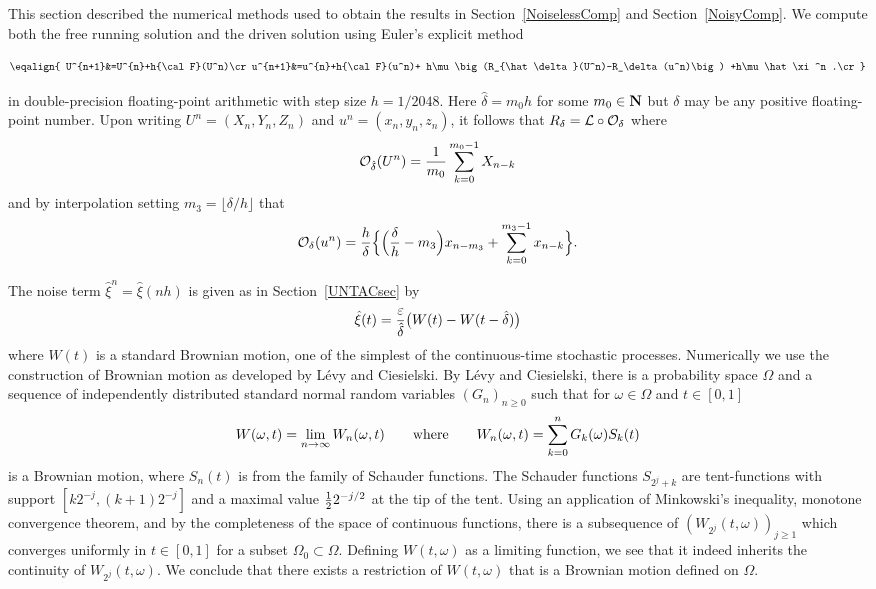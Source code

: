 \documentclass[master,tocprelim,12pt]{unrthesis}
\theoremstyle{definition}
\def\wwords#1{\qquad\hbox{#1}\qquad}
\numberwithin{equation}{chapter}
\begin{document}
\begin{manuscript}
This section described the numerical methods used to obtain the 
results in Section~\ref{NoiselessComp} and Section~\ref{NoisyComp}.
We compute both the free running solution and the driven solution
using Euler's explicit method
\begin{plain}$$\eqalign{
	U^{n+1}&=U^{n}+h{\cal F}(U^n)\cr
	u^{n+1}&=u^{n}+h{\cal F}(u^n)+
		h\mu\big(R_{\hat\delta}(U^n)-R_\delta(u^n)\big)
		+h\mu\hat\xi^n
.\cr
}$$\end{plain}%
in double-precision floating-point arithmetic
with step size $h=1/2048$. 
Here $\hat\delta=m_0h$ for some $m_0\in{\bf N}$
but $\delta$ may be any positive floating-point number.
Upon writing $U^n=(X_n,Y_n,Z_n)$ and $u^n=(x_n,y_n,z_n)$, it 
follows that $R_\delta={\cal L}\circ{\cal O}_{\delta}$ where
$$
	{\cal O}_{\hat\delta}(U^n)={1\over m_0}\sum_{k=0}^{m_0-1} X_{n-k}
$$
and 
by interpolation 
setting $m_3=\lfloor\delta/h\rfloor$ that
$$
	{\cal O}_{\delta}(u^n)=
	{h\over\delta}\Big\{
		\Big({\delta\over h}-m_3\Big)
		x_{n-m_3}+
			\sum_{k=0}^{m_3-1} x_{n-k}
		\Big\}.
$$


The noise term $\hat\xi^n=\hat\xi(nh)$ is given as in Section~\ref{UNTACsec}
by
$$
	\hat\xi(t)={\varepsilon\over\hat\delta}\big(W(t)-W(t-\hat\delta)\big)
$$
where $W(t)$ is a standard Brownian motion,
one of the simplest of the continuous-time stochastic 
processes.
Numerically we use the construction of Brownian
motion as developed by L\'evy and Ciesielski.
By L\'evy and Ciesielski, there is a probability space $\Omega$ and a sequence
of independently distributed standard normal random variables $(G_n)_{n\ge 0}$
such that for $\omega\in\Omega$ and $t\in[0,1]$
$$
W(\omega, t)= \lim_{n\to\infty} W_n(\omega,t)
\wwords{where}
	W_n(\omega,t)=\displaystyle\sum_{k=0}^n G_k(\omega)S_k(t)
$$
is a Brownian motion, where $S_n(t)$ is from the family of Schauder functions.
The Schauder functions $S_{2^j+k}$ are tent-functions with support $[k2^{-j},
(k+1)2^{-j}]$ and a maximal value $\textstyle{1\over 2}2^{-j/2}$ at the tip of the
tent.
Using an application of Minkowski's inequality, monotone convergence theorem,
and by the completeness of the space of continuous functions, there is a
subsequence of $(W_{2^j}(t, \omega))_{j\ge 1}$ which converges uniformly in
$t\in[0,1]$ for a subset $\Omega_0\subset \Omega$.
Defining $W(t, \omega)$ as a limiting function, we see that it
indeed inherits the continuity of $W_{2^j}(t, \omega)$. We conclude that there
exists a restriction of $W(t, \omega)$ that is a Brownian motion defined on
$\Omega$.


\end{manuscript}
\end{document}
